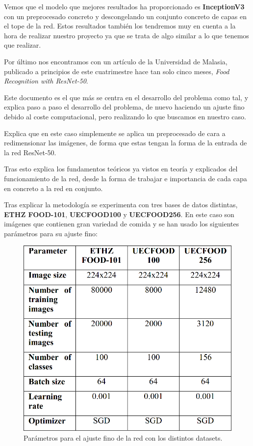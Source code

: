 \vspace{5 mm}

Vemos que el modelo que mejores resultados ha proporcionado es \textbf{InceptionV3} con un preprocesado concreto y descongelando un conjunto concreto de capas en el tope de la red. Estos resultados también los tendremos muy en cuenta a la hora de realizar nuestro proyecto ya que se trata de algo similar a lo que tenemos que realizar.


\newpage

Por último nos encontramos con un artículo de la Universidad de Malasia, publicado a principios de este cuatrimestre hace tan solo cinco meses,
\textit{Food Recognition with ResNet-50}\cite{food-resnet}.

Este documento es el que más se centra en el desarrollo del problema como tal, y explica paso a paso el desarrollo del problema, de nuevo haciendo un ajuste fino debido al coste computacional, pero realizando lo que buscamos en nuestro caso.

Explica que en este caso simplemente se aplica un preprocesado de cara a redimensionar las imágenes, de forma que estas tengan la forma de la entrada de la red ResNet-50.

Tras esto explica los fundamentos teóricos ya vistos en teoría y explicados del funcionamiento de la red, desde la forma de trabajar e importancia de cada capa en concreto a la red en conjunto.

Tras explicar la metodología se experimenta con tres bases de datos distintas, \textbf{ETHZ FOOD-101}, \textbf{UECFOOD100} y \textbf{UECFOOD256}. En este caso son imágenes que contienen gran variedad de comida y se han usado los siguientes parámetros para su ajuste fino:

\begin{figure}[H]
  \centering
  \includegraphics[width=0.5\linewidth]{Imagenes/parametros_food_resnet.png}
  \caption{Parámetros para el ajuste fino de la red con los distintos datasets.}
  \label{fig:sub-first}
\end{figure}

